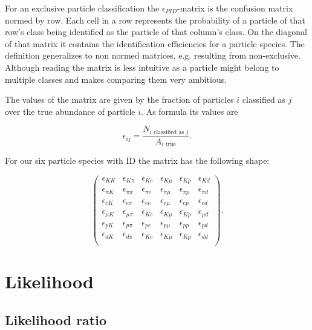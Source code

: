 For an exclusive particle classification the $\epsilon_{PID}$-matrix is the confusion matrix normed by row. Each cell in a row represents the probability of a particle of that row's class being identified as the particle of that column's class. On the diagonal of that matrix it contains the identification efficiencies for a particle species.
The definition generalizes to non normed matrices, e.g. resulting from non-exclusive. Although reading the matrix is less intuitive as a particle might belong to multiple classes and makes comparing them very ambitious.

The values of the matrix are given by the fraction of particles $i$ classified as $j$ over the true abundance of particle $i$. As formula its values are

\begin{equation}
	\epsilon_{i j} = \frac{N_{i \text{ classified as } j}}{A_{i \text{ true}}}.
\end{equation}

For our six particle species with ID the matrix has the following shape:

\begin{equation}
	\begin{pmatrix}
		\epsilon_{K K} & \epsilon_{K \pi} & \epsilon_{K e} & \epsilon_{K \mu} & \epsilon_{K p} & \epsilon_{K d} \\
		\epsilon_{\pi K} & \epsilon_{\pi \pi} & \epsilon_{\pi e} & \epsilon_{\pi \mu} & \epsilon_{\pi p} & \epsilon_{\pi d} \\
		\epsilon_{e K} & \epsilon_{e \pi} & \epsilon_{e e} & \epsilon_{e \mu} & \epsilon_{e p} & \epsilon_{e d} \\
		\epsilon_{\mu K} & \epsilon_{\mu \pi} & \epsilon_{K e} & \epsilon_{K \mu} & \epsilon_{K p} & \epsilon_{\mu d} \\
		\epsilon_{p K} & \epsilon_{p \pi} & \epsilon_{p e} & \epsilon_{p \mu} & \epsilon_{p p} & \epsilon_{p d} \\
		\epsilon_{d K} & \epsilon_{d \pi} & \epsilon_{K e} & \epsilon_{K \mu} & \epsilon_{K p} & \epsilon_{d d} \\
	\end{pmatrix}.
\end{equation}

\section{Likelihood}
\label{sec:likelihood}

\subsection{Likelihood ratio}
\label{subsec:likelihood_ratios}

